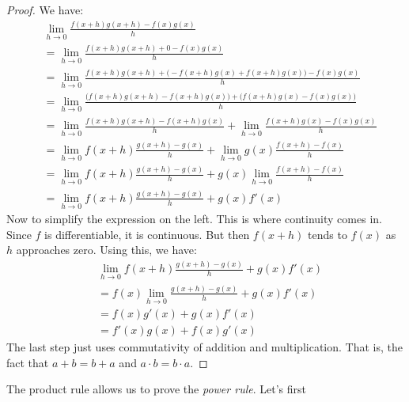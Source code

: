 \documentclass{article}
\theoremstyle{normal}
\theoremstyle{plain}
\begin{document}
    \begin{proof}
        We have:
        \begin{align}
            &\lim_{h\rightarrow{0}}
                \frac{f(x+h)g(x+h)-f(x)g(x)}{h}\nonumber\\
            &=\lim_{h\rightarrow{0}}\frac{f(x+h)g(x+h)+0-f(x)g(x)}{h}\\
            &=\lim_{h\rightarrow{0}}
                \frac{f(x+h)g(x+h)+\big(-f(x+h)g(x)+f(x+h)g(x)\big)-f(x)g(x)}
                     {h}\\
            &=\lim_{h\rightarrow{0}}
                \frac{\big(f(x+h)g(x+h)-f(x+h)g(x)\big)
                      +\big(f(x+h)g(x)-f(x)g(x)\big)}{h}\\
            &=
                \lim_{h\rightarrow{0}}
                \frac{f(x+h)g(x+h)-f(x+h)g(x)}{h}+
                \lim_{h\rightarrow{0}}
                    \frac{f(x+h)g(x)-f(x)g(x)}{h}\\
            &=\lim_{h\rightarrow{0}}
                f(x+h)\frac{g(x+h)-g(x)}{h}+
                \lim_{h\rightarrow{0}}g(x)
                    \frac{f(x+h)-f(x)}{h}\\
                    &=\lim_{h\rightarrow{0}}
                        f(x+h)\frac{g(x+h)-g(x)}{h}+
                        g(x)\lim_{h\rightarrow{0}}
                        \frac{f(x+h)-f(x)}{h}\\
                    &=\lim_{h\rightarrow{0}}
                        f(x+h)\frac{g(x+h)-g(x)}{h}+
                        g(x)f'(x)
        \end{align}
        Now to simplify the expression on the left. This is where
        continuity comes in. Since $f$ is differentiable, it is continuous.
        But then $f(x+h)$ tends to $f(x)$ as $h$ approaches zero. Using this, we
        have:
        \begin{align}
            &\lim_{h\rightarrow{0}}
                f(x+h)\frac{g(x+h)-g(x)}{h}+g(x)f'(x)\nonumber\\
            &=f(x)\lim_{h\rightarrow{0}}\frac{g(x+h)-g(x)}{h}+g(x)f'(x)\\
            &=f(x)g'(x)+g(x)f'(x)\\
            &=f'(x)g(x)+f(x)g'(x)
        \end{align}
        The last step just uses commutativity of addition and multiplication.
        That is, the fact that $a+b=b+a$ and $a\cdot{b}=b\cdot{a}$.
    \end{proof}
    The product rule allows us to prove the \textit{power rule}. Let's first
\end{document}

